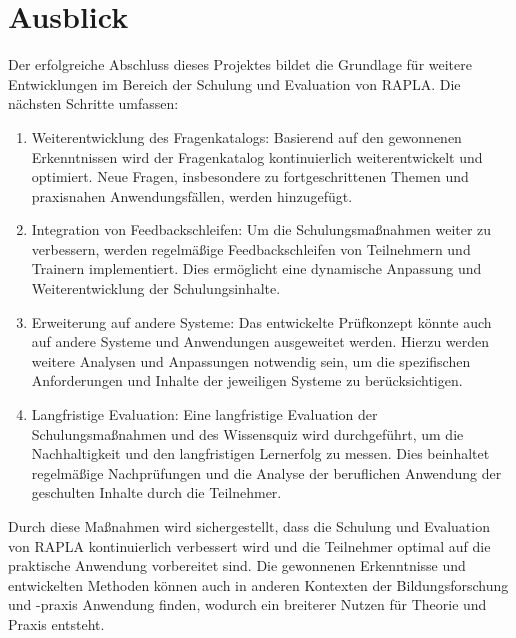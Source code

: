 \section{Ausblick}
Der erfolgreiche Abschluss dieses Projektes bildet die Grundlage für weitere Entwicklungen im Bereich der Schulung und Evaluation von RAPLA. Die nächsten Schritte umfassen:
\begin{enumerate}
    \item Weiterentwicklung des Fragenkatalogs: Basierend auf den gewonnenen Erkenntnissen wird der Fragenkatalog kontinuierlich weiterentwickelt und optimiert. Neue Fragen, insbesondere zu fortgeschrittenen Themen und praxisnahen Anwendungsfällen, werden hinzugefügt.
    \item Integration von Feedbackschleifen: Um die Schulungsmaßnahmen weiter zu verbessern, werden regelmäßige Feedbackschleifen von Teilnehmern und Trainern implementiert. Dies ermöglicht eine dynamische Anpassung und Weiterentwicklung der Schulungsinhalte.
    \item Erweiterung auf andere Systeme: Das entwickelte Prüfkonzept könnte auch auf andere Systeme und Anwendungen ausgeweitet werden. Hierzu werden weitere Analysen und Anpassungen notwendig sein, um die spezifischen Anforderungen und Inhalte der jeweiligen Systeme zu berücksichtigen.
    \item Langfristige Evaluation: Eine langfristige Evaluation der Schulungsmaßnahmen und des Wissensquiz wird durchgeführt, um die Nachhaltigkeit und den langfristigen Lernerfolg zu messen. Dies beinhaltet regelmäßige Nachprüfungen und die Analyse der beruflichen Anwendung der geschulten Inhalte durch die Teilnehmer.
\end{enumerate}
Durch diese Maßnahmen wird sichergestellt, dass die Schulung und Evaluation von RAPLA kontinuierlich verbessert wird und die Teilnehmer optimal auf die praktische Anwendung vorbereitet sind. Die gewonnenen Erkenntnisse und entwickelten Methoden können auch in anderen Kontexten der Bildungsforschung und -praxis Anwendung finden, wodurch ein breiterer Nutzen für Theorie und Praxis entsteht.
